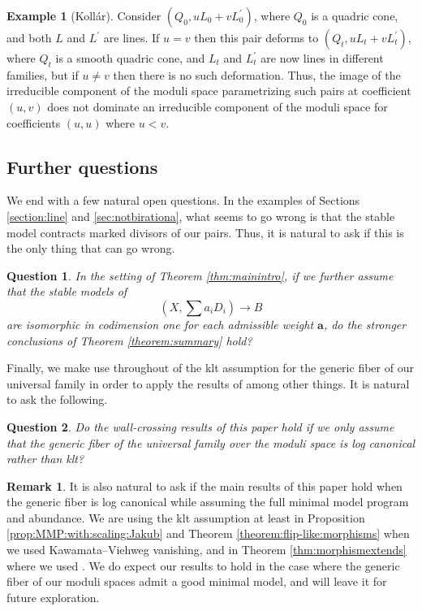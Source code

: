 \documentclass[11pt]{amsart}
\newtheorem{question}{Question}
\theoremstyle{definition}
\newtheorem{example}[theorem]{Example}
\newtheorem{remark}[theorem]{Remark}
\theoremstyle{remark}
\newcommand{\bfa}{\mathbf{a}}
\begin{document}
	\begin{example}[Koll\'ar]\label{ex:JK}Consider $(Q_0, uL_0 + vL^\prime_0)$, where $Q_0$ is a quadric cone, and both $L$ and $L^\prime$ are lines. If $u=v$ then this pair deforms to $(Q_t, uL_t + vL^\prime_t)$, where $Q_t$ is a smooth quadric cone, and $L_t$ and $L^\prime_t$ are now lines in different families, but if $u \neq v$ then there is no such deformation. Thus, the image of the irreducible component of the moduli space parametrizing such pairs at coefficient $(u,v)$ does not dominate an irreducible component of the moduli space for coefficients $(u,u)$ where $u < v$. 
	\end{example}
	
	
	\subsection{Further questions}
	
	We end with a few natural open questions. In the examples of Sections \ref{section:line} and \ref{sec:notbirationa}, what seems to go wrong is that the stable model contracts marked divisors of our pairs. Thus, it is natural to ask if this is the only thing that can go wrong. 
	
	\begin{question} In the setting of Theorem \ref{thm:mainintro}, if we further assume that the stable models of $$(X, \sum a_i D_i) \to B$$ are isomorphic in codimension one for each admissible weight $\bfa$, do the stronger conclusions of Theorem \ref{theorem:summary} hold?
	\end{question}
	
	Finally, we make use throughout of the klt assumption for the generic fiber of our universal family in order to apply the results of \cite{BCHM10} among other things. It is natural to ask the following. 
	
	\begin{question} Do the wall-crossing results of this paper hold if we only assume that the generic fiber of the universal family over the moduli space is log canonical rather than klt?
	\end{question} 
	
	\begin{remark}\label{rmk:abundance}
		It is also natural to ask if the main results of this paper hold when the generic fiber is log canonical while assuming the full minimal model program and abundance. We are using the klt assumption at least in Proposition \ref{prop:MMP:with:scaling:Jakub} and
		Theorem \ref{theorem:flip-like:morphisms} when we used Kawamata--Viehweg vanishing, and in Theorem \ref{thm:morphismextends} where we used \cite{BCHM10}. We do expect our results to hold in the case where the generic fiber of our moduli spaces admit a good minimal model, and will leave it for future exploration.
	\end{remark}
	
	
	
	
	
	
	
	
	
	
\end{document}
